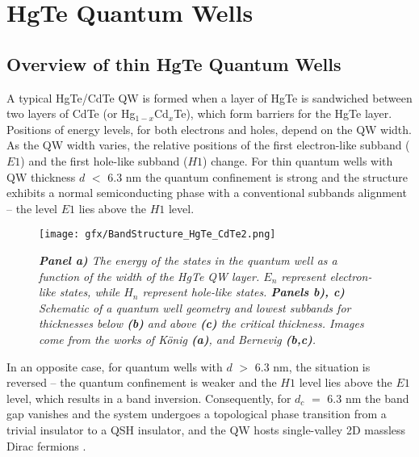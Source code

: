 \documentclass[titlepage,a4paper]{book}
\newcommand{\wciecie}{\quad\phantom{v}}
\begin{document}
\chapter{HgTe Quantum Wells}
\label{chpt:MCT_QW_general}
\section{Overview of thin HgTe Quantum Wells}
\label{chpt:MCT_QW}
\wciecie
A typical HgTe/CdTe QW is formed when a layer of HgTe is sandwiched between two layers of CdTe (or Hg$_{1-x}$Cd$_x$Te), which form barriers for the HgTe layer. Positions of energy levels, for both electrons and holes, depend on the QW width. As the QW width varies, the relative positions of the first electron-like subband ($E1$) and the first hole-like subband ($H1$) change. For thin quantum wells with QW thickness $d$ $<$ 6.3 nm the quantum confinement is strong and the structure exhibits a normal semiconducting phase with a conventional subbands alignment -- the level $E1$ lies above the $H1$ level. 

\begin{figure}[ht]
	\centering
	\texttt{[image: gfx/BandStructure\_HgTe\_CdTe2.png]}
	\vspace{-10pt}
	\caption{\textit{\textbf{Panel a)} The energy of the states in the quantum well as a function of the width of the HgTe QW layer. $E_n$ represent electron-like states, while $H_n$ represent hole-like states. \textbf{Panels b), c)} Schematic of a quantum well geometry and lowest subbands for thicknesses below \textbf{(b)} and above \textbf{(c)} the critical thickness. Images come from the works of König \cite{Konig_MCT_SQW} \textbf{(a)}, and Bernevig \cite{Bernevig_Topology2} \textbf{(b,c)}.}}
	\label{fig:BandStructure_HgTe_CdTe2}
\end{figure} 

In an opposite case, for quantum wells with $d$ $>$ 6.3 nm, the situation is reversed -- the quantum confinement is weaker and the $H1$ level lies above the $E1$ level, which results in a band inversion. Consequently, for $d_c$ $=$ 6.3 nm the band gap vanishes and the system undergoes a topological phase transition from a trivial insulator to a QSH insulator, and the QW hosts single-valley 2D massless Dirac fermions \cite{Buttner_MCT_SQW}. 
\end{document}
